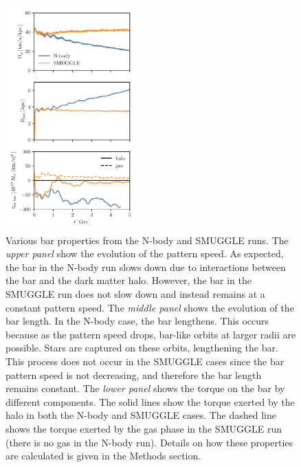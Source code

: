 \documentclass{natureprintstyle}
\begin{document}
\begin{figure}[h!]%
\centering
\includegraphics[width=0.45\textwidth]{fig/fig2.pdf}
\caption{Various bar properties from the N-body and SMUGGLE runs. The
\textit{upper panel} show the evolution of the pattern speed. As expected, the
bar in the N-body run slows down due to interactions between the bar and the
dark matter halo. However, the bar in the SMUGGLE run does not slow down and
instead remains at a constant pattern speed. The \textit{middle panel} shows
the evolution of the bar length. In the N-body case, the bar lengthens. This
occurs because as the pattern speed drops, bar-like orbits at larger radii are
possible. Stars are captured on these orbits, lengthening the bar. This
process does not occur in the SMUGGLE cases since the bar pattern speed is not
decreasing, and therefore the bar length remains constant. The \textit{lower
panel} shows the torque on the bar by different components. The solid lines
show the torque exerted by the halo in both the N-body and SMUGGLE cases. The
dashed line shows the torque exerted by the gas phase in the SMUGGLE run
(there is no gas in the N-body run). Details on how these properties
are calculated is given in the Methods section.}\label{fig:prop}
\end{figure}
\end{document}
